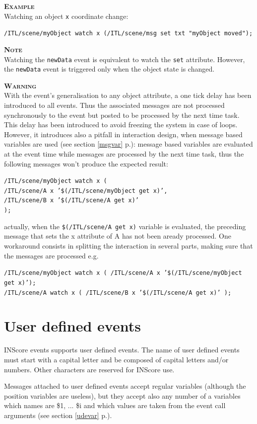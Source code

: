 \documentclass[a4paper,twoside]{report}
\newcommand{\sublevel}[1]	{\section{#1}}
\newcommand{\fullref}[1]	{\ref{#1} p.\pageref{#1}}
\newcommand{\OSC}[1]		{\texttt{#1}}
\newcommand{\example}		{\textbf{\hspace{-1.5cm}\textbf{\textsc{Example }}}}
\newcommand{\note}	[1]		{\vspace{2mm}\textbf{\hspace{-0.9cm}\textbf{\textsc{Note #1}}}}
\newcommand{\warning}[1]	{\vspace{2mm}\textbf{\hspace{-1.5cm}\textbf{\textsc{Warning #1}}}}
\newcommand{\sample}	[1]			{\vspace{-2mm}\begin{center}\colorbox{mygrey}{
								\begin{minipage}[t]{0.9\columnwidth} 
								{\small \texttt{#1}}
								\end{minipage}}\end{center}}
\begin{document}
\example \\
Watching an object \OSC{x} coordinate change:
\sample{/ITL/scene/myObject watch x (/ITL/scene/msg set txt "myObject moved");}

\note \\
Watching the \OSC{newData} event is equivalent to watch the \OSC{set} attribute. However, the \OSC{newData} event is triggered only when the object state is changed.

\warning \\
With the event's generalisation to any object attribute, a one tick delay has been introduced to all events. Thus the associated messages are not processed synchronously to the event but posted to be processed by the next time task. This delay has been introduced to avoid freezing the system in case of loops. However, it introduces also a pitfall in interaction design, when message based variables are used (see section \fullref{msgvar}): message based variables are evaluated at the event time while messages are processed by the next time task, thus the following messages won't produce the expected result:
\sample{/ITL/scene/myObject watch x ( \\
\hspace*{1cm} /ITL/scene/A x '\$(/ITL/scene/myObject get x)', \\
\hspace*{1cm} /ITL/scene/B x '\$(/ITL/scene/A get x)' \\
);}
actually, when the \OSC{\$(/ITL/scene/A get x)} variable is evaluated, the preceding message that sets the x attribute of A has not been aready processed.
One workaround consists in splitting the interaction in several parts, making sure that the messages are processed e.g.
\sample{/ITL/scene/myObject watch x ( /ITL/scene/A x '\$(/ITL/scene/myObject get x)'); \\
/ITL/scene/A watch x ( /ITL/scene/B x '\$(/ITL/scene/A get x)' );
}




\sublevel{User defined events}
\label{userevents}

INScore events supports user defined events. The name of user defined events must start with a capital letter and be composed of capital letters and/or numbers. Other characters are reserved for INScore use.

Messages attached to user defined events accept regular variables (although the position variables are useless), 
but they accept also any number of a variables which names are \$1, ... \$i and which values are taken from the event call arguments (see section \fullref{udevar}).
\end{document}
